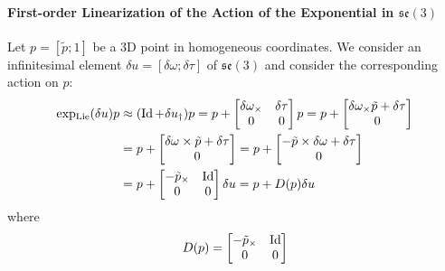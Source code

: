 \paragraph{First-order Linearization of the Action of the Exponential in $\mathfrak{se}(3)$}
Let $p=[\tilde{p};1]$ be a 3D point in homogeneous coordinates. We consider an infinitesimal element $\delta u=[\delta \omega;\delta \tau]$ of $\mathfrak{se}(3)$ and consider the corresponding action on $p$:
\begin{equation}
\begin{split}
\operatorname{exp_{Lie}}(\delta u)p &\approx (\operatorname{Id}+\delta u_\dagger)p = p +
\begin{bmatrix}
\delta \omega_\times & \delta \tau \\
0  & 0
\end{bmatrix} p
= p +
\begin{bmatrix}
\delta \omega_\times \tilde{p}+\delta \tau \\
0
\end{bmatrix} \\
&= p +
\begin{bmatrix}
\delta \omega \times \tilde{p}+\delta \tau \\
0
\end{bmatrix}
= p +
\begin{bmatrix}
-\tilde{p} \times \delta \omega + \delta \tau \\
0
\end{bmatrix} \\
&= p +
\begin{bmatrix}
-\tilde{p}_\times & \operatorname{Id} \\
0 & 0
\end{bmatrix} \delta u
= p + D(p)\delta u
\end{split}
\end{equation}
where
\begin{equation}
D(p) = 
\begin{bmatrix}
-\tilde{p}_\times & \operatorname{Id} \\
0 & 0
\end{bmatrix}
\end{equation}

